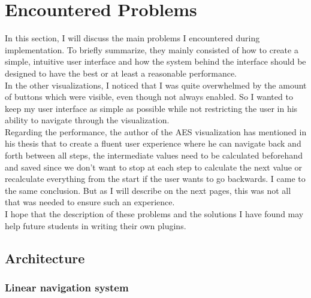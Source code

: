 \blindtext[8]


\section{Encountered Problems}
\label{sec:encounteredProblems}

In this section, I will discuss the main problems I encountered during implementation. To briefly summarize, they mainly consisted of how to create a simple, intuitive user interface and how the system behind the interface should be designed to have the best or at least a reasonable performance. \\ In the other visualizations, I noticed that I was quite overwhelmed by the amount of buttons which were visible, even though not always enabled. So I wanted to keep my user interface as simple as possible while not restricting the user in his ability to navigate through the visualization. \\ Regarding the performance, the author of the AES visualization has mentioned in his thesis that to create a fluent user experience where he can navigate back and forth between all steps, the intermediate values need to be calculated beforehand and saved since we don't want to stop at each step to calculate the next value or recalculate everything from the start if the user wants to go backwards. I came to the same conclusion. But as I will describe on the next pages, this was not all that was needed to ensure such an experience.\\
I hope that the description of these problems and the solutions I have found may help future students in writing their own plugins.

\subsection{Architecture}

\subsubsection{Linear navigation system}

